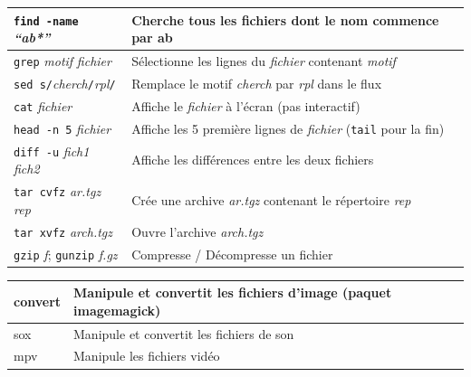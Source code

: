 \documentclass[a4paper,10pt,landscape,twocolumn]{article}
\newcommand{\Subsection}[1]{{\textbf{#1}}}
\begin{document}
\begin{tabular}{|p{3cm}|p{10cm}|}\hline
\texttt{find -name} \textit{``ab*''} & Cherche tous les fichiers dont le nom commence par ab \\\hline

\texttt{grep} \textit{motif} \textit{fichier}& Sélectionne les lignes du \textit{fichier}
contenant \textit{motif}\\\hline

  \texttt{sed s/}\textit{cherch}\texttt{/}\textit{rpl}\texttt{/}&
  Remplace le motif \textit{cherch} par \textit{rpl} dans le flux\\\hline 
\texttt{cat} \textit{fichier}& Affiche le \textit{fichier} à l'écran (pas interactif)\\ \hline

  \texttt{head -n 5} \textit{fichier}&
   Affiche les 5 première lignes de \textit{fichier} (\texttt{tail} pour la fin) \\\hline

\texttt{diff -u} \textit{fich1} \textit{fich2}& Affiche les différences entre les deux fichiers\\\hline

{\small \texttt{tar cvfz} \textit{ar.tgz} \textit{rep}} & Crée une archive \textit{ar.tgz}
contenant le répertoire \textit{rep}\\
\texttt{tar xvfz} \textit{arch.tgz} & Ouvre l'archive \textit{arch.tgz}\\\hline

\texttt{gzip} \textit{f}; \texttt{gunzip} \textit{f.gz} & Compresse / Décompresse un fichier\\\hline
\end{tabular}

\medskip\Subsection{Convertions}\smallskip

\begin{tabular}{|p{30mm}|p{100mm}|}\hline
convert & Manipule et convertit les fichiers d'image (paquet imagemagick)\\\hline
sox & Manipule et convertit les fichiers de son\\\hline
mpv & Manipule les fichiers vidéo\\\hline
\end{tabular}
\end{document}
